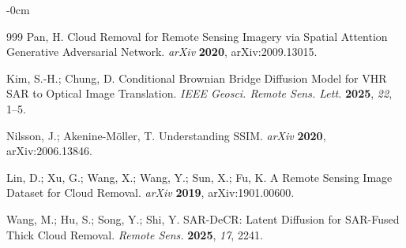 \documentclass[remotesensing,article,submit,pdftex,moreauthors]{Definitions/mdpi}
\begin{document}
\begin{adjustwidth}{-\extralength}{0cm}
\begin{thebibliography}{999}
Pan, H. Cloud Removal for Remote Sensing Imagery via Spatial Attention Generative Adversarial Network. {\em arXiv} {\bf 2020}, arXiv:2009.13015.

Kim, S.-H.; Chung, D. Conditional Brownian Bridge Diffusion Model for VHR SAR to Optical Image Translation. {\em IEEE Geosci. Remote Sens. Lett.} {\bf 2025}, {\em 22}, 1--5.

Nilsson, J.; Akenine-Möller, T. Understanding SSIM. {\em arXiv} {\bf 2020}, arXiv:2006.13846.

Lin, D.; Xu, G.; Wang, X.; Wang, Y.; Sun, X.; Fu, K. A Remote Sensing Image Dataset for Cloud Removal. {\em arXiv} {\bf 2019}, arXiv:1901.00600.

Wang, M.; Hu, S.; Song, Y.; Shi, Y. SAR-DeCR: Latent Diffusion for SAR-Fused Thick Cloud Removal. {\em Remote Sens.} {\bf 2025}, {\em 17}, 2241.

\end{thebibliography}

%


\PublishersNote{}
\end{adjustwidth}
\end{document}
